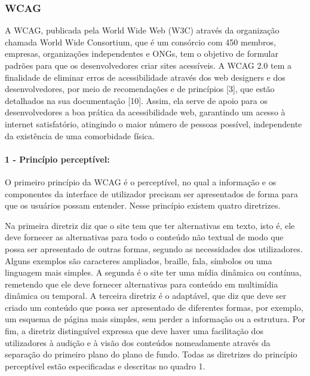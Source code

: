 \documentclass[a4paper]{article}
\begin{document}
\begin{titlepage}
\subsubsection{WCAG}

A WCAG, publicada pela World Wide Web (W3C) através da organização chamada World Wide Consortium, que é um consórcio com 450 membros, empresas, organizações independentes e ONGs, tem o objetivo de formular padrões para que os desenvolvedores criar sites acessíveis. A WCAG 2.0 tem a finalidade de eliminar erros de acessibilidade através dos web designers e dos desenvolvedores, por meio de recomendações e de princípios [3], que estão detalhados na sua documentação [10]. Assim, ela serve de apoio para os desenvolvedores a boa prática da acessibilidade web, garantindo um acesso à internet satisfatório, atingindo o maior número de pessoas possível, independente da existência de uma comorbidade física.

\paragraph{1 - Princípio perceptível:}

O primeiro princípio da WCAG é o perceptível, no qual a informação e os componentes da interface de utilizador precisam ser apresentados de forma para que os usuários possam entender. Nesse princípio existem quatro diretrizes.

Na primeira diretriz diz que o site tem que ter alternativas em texto, isto é, ele deve fornecer as alternativas para todo o conteúdo não textual de modo que possa ser apresentado de outras formas, segundo as necessidades dos utilizadores. Alguns exemplos são caracteres ampliados, braille, fala, símbolos ou uma linguagem mais simples. A segunda é o site ter uma mídia dinâmica ou contínua, remetendo que ele deve fornecer alternativas para conteúdo em multimídia dinâmica ou temporal. A terceira diretriz é o adaptável, que diz que deve ser criado um conteúdo que possa ser apresentado de diferentes formas, por exemplo, um esquema de página mais simples, sem perder a informação ou a estrutura. Por fim, a diretriz distinguível expressa que deve haver uma facilitação dos utilizadores à audição e à visão dos conteúdos nomeadamente através da separação do primeiro plano do plano de fundo. Todas as diretrizes do princípio perceptível estão especificadas e descritas no quadro 1.\\


\end{titlepage}
\end{document}
